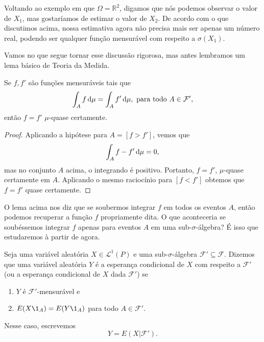 \documentclass[../Notas_de_aula.tex]{subfiles}
\begin{document}
Voltando ao exemplo em que $\Omega = \mathbb{R}^2$, digamos que nós podemos observar o valor de $X_1$, mas gostaríamos de estimar o valor de $X_2$.
De acordo com o que discutimos acima, nossa estimativa agora não precisa mais ser apenas um número real, podendo ser qualquer função mensurável com respeito a $\sigma(X_1)$.

Vamos no que segue tornar esse discussão rigorosa, mas antes lembramos um lema básico de Teoria da Medida.

\begin{lemma}
  \label{l:f_igual_fp}
  Se $f, f'$ são funções mensuráveis tais que
  \begin{equation}
    \int_A f \mathop{}\!\mathrm{d} \mu = \int_A f' \mathop{}\!\mathrm{d} \mu, \text{ para todo $A \in \mathcal{F}'$,}
  \end{equation}
  então $f = f'$ $\mu$-quase certamente.
\end{lemma}

\begin{proof}
  Aplicando a hipótese para $A = [f > f']$, vemos que
  \begin{equation}
    \int_A f - f' \mathop{}\!\mathrm{d} \mu = 0,
  \end{equation}
  mas no conjunto $A$ acima, o integrando é positivo.
  Portanto, $f = f'$, $\mu$-quase certamente em $A$.
  Aplicando o mesmo raciocínio para $[f < f']$ obtemos que $f = f'$ quase certamente.
\end{proof}

O lema acima nos diz que se soubermos integrar $f$ em todos os eventos $A$, então podemos recuperar a função $f$ propriamente dita.
O que aconteceria se soubéssemos integrar $f$ apenas para eventos $A$ em uma sub-$\sigma$-álgebra?
É isso que estudaremos à partir de agora.

\begin{definition}
  \label{d:esperanca_condicional}
  Seja uma variável aleatória $X \in \mathcal{L}^1(P)$ e uma sub-$\sigma$-álgebra $\mathcal{F}' \subseteq \mathcal{F}$.
  Dizemos que uma variável aleatória $Y$ é a esperança condicional  de $X$ com respeito a $\mathcal{F}'$ (ou a esperança condicional de $X$ dada $\mathcal{F}'$) se
  \begin{enumerate}[\quad a)]
  \item $Y$ é $\mathcal{F}'$-mensurável e
  \item $E(X \1_{A}) = E(Y \1_{A})$ para todo $A \in \mathcal{F}'$.
  \end{enumerate}
  Nesse caso, escrevemos
  \begin{equation}
    Y = E(X | \mathcal{F}').
  \end{equation}
\end{definition}
\end{document}
